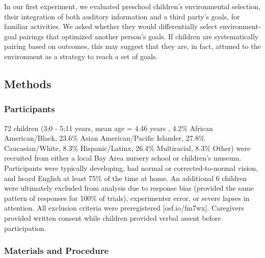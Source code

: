 \documentclass[10pt, letterpaper]{article}
\begin{document}
In our first experiment, we evaluated preschool children's environmental
selection, their integration of both auditory information and a third
party's goals, for familiar activities. We asked whether they would
differentially select environment-goal pairings that optimized another
person's goals. If children are systematically pairing based on
outcomes, this may suggest that they are, in fact, attuned to the
environment as a strategy to reach a set of goals.

\hypertarget{methods}{%
\subsection{Methods}\label{methods}}

\hypertarget{participants}{%
\subsubsection{Participants}\label{participants}}

72 children (3;0 - 5;11 years, mean age = 4.46 years , 4.2\% African
American/Black, 23.6\% Asian American/Pacific Islander, 27.8\%
Caucasian/White, 8.3\% Hispanic/Latinx, 26.4\% Multiracial, 8.3\% Other)
were recruited from either a local Bay Area nursery school or children's
museum. Participants were typically developing, had normal or
corrected-to-normal vision, and heard English at least 75\% of the time
at home. An additional 6 children were ultimately excluded from analysis
due to response bias (provided the same pattern of responses for 100\%
of trials), experimenter error, or severe lapses in attention. All
exclusion criteria were preregistered {[}osf.io/fm7wx{]}. Caregivers
provided written consent while children provided verbal assent before
participation.

\hypertarget{materials-and-procedure}{%
\subsubsection{Materials and Procedure}\label{materials-and-procedure}}
\end{document}
